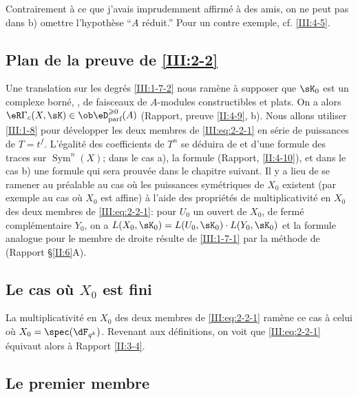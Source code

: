 Contrairement à ce que j'avais imprudemment affirmé à des amis, on ne 
peut pas dans b) omettre l'hypothèse ``$A$ réduit.'' Pour un contre 
exemple, cf. \ref{III:4-5}. 





\subsection{Plan de la preuve de \ref{III:2-2}}\label{III:2-8}

Une translation sur les degrés \ref{III:1-7-2} nous ramène à supposer 
que $\sK_0$ est un complexe borné, , de faisceaux de 
$A$-modules constructibles et plats. On a alors 
$\eR\Gamma_c(X,\sK)\in \ob\eD_\text{parf}^{\geqslant 0}(A)$ (Rapport, 
preuve \ref{II:4-9}, b). Nous allons utiliser \ref{III:1-8} pour développer 
les deux membres de \eqref{III:eq:2-2-1} en série de puissances de $T=t^f$. 
L'égalité des coefficients de $T^n$ se déduira de 
 et d'une formule des traces sur 
$\operatorname{Sym}^n(X)$; dans le cas a), la formule (Rapport, 
\ref{II:4-10}), et dans le cas b) une formule qui sera prouvée dans le 
chapitre suivant. Il y a lieu de se ramener au préalable au cas où les 
puissances symétriques de $X_0$ existent (par exemple au cas où $X_0$ est 
affine) à l'aide des propriétés de multiplicativité en $X_0$ des deux 
membres de \eqref{III:eq:2-2-1}: pour $U_0$ un ouvert de $X_0$, de fermé 
complémentaire $Y_0$, on a $L(X_0,\sK_0)=L(U_0,\sK_0)\cdot L(Y_0,\sK_0)$ et 
la formule analogue pour le membre de droite résulte de \ref{III:1-7-1} 
par la méthode de (Rapport \S\ref{II:6}A). 





\subsection{Le cas où $X_0$ est fini}\label{III:2-9}

La multiplicativité en $X_0$ des deux membres de \eqref{III:eq:2-2-1} 
ramène ce cas à celui où $X_0=\spec(\dF_{q^k})$. Revenant aux 
définitions, on voit que \eqref{III:eq:2-2-1} équivaut alors à 
Rapport \ref{II:3-4}. 





\subsection{Le premier membre}\label{III:2-10}


